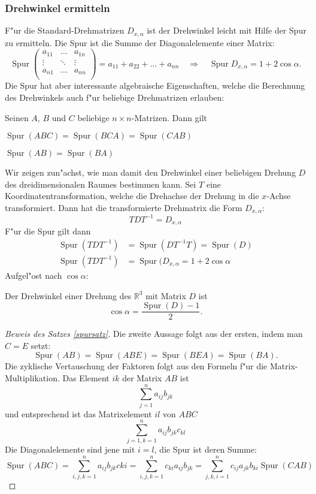 \subsubsection{Drehwinkel ermitteln}
F"ur die Standard-Drehmatrizen $D_{x,\alpha}$ ist der Drehwinkel 
leicht mit Hilfe der Spur zu ermitteln. Die Spur ist die Summe der
Diagonalelemente einer Matrix:
\[
\operatorname{Spur}
\begin{pmatrix}
a_{11}&\dots &a_{1n}\\
\vdots&\ddots&\vdots\\
a_{n1}&\dots &a_{nn}\\
\end{pmatrix}
=a_{11}+a_{22}+\dots+a_{nn}
\quad
\Rightarrow
\quad
\operatorname{Spur}D_{x,\alpha}=1+2\cos\alpha.
\]
Die Spur hat aber interessante algebraische Eigenschaften, welche
die Berechnung des Drehwinkels auch f"ur beliebige Drehmatrizen
erlauben:
\begin{satz}
\label{spursatz}
Seinen $A$, $B$ und $C$ beliebige $n\times n$-Matrizen. Dann gilt
\begin{compactenum}
\item $\operatorname{Spur}(ABC)=\operatorname{Spur}(BCA)=\operatorname{Spur}(CAB)$
\item $\operatorname{Spur}(AB)=\operatorname{Spur}(BA)$
\end{compactenum}
\end{satz}
Wir zeigen zun"achst, wie man damit den Drehwinkel einer beliebigen
Drehung $D$ des dreidimensionalen Raumes bestimmen kann. Sei $T$ eine
Koordinatentransformation, welche die Drehachse der Drehung in die
$x$-Achse transformiert. Dann hat die transformierte Drehmatrix die
Form $D_{x,\alpha}$:
\[
TDT^{-1}= D_{x,\alpha}
\]
F"ur die Spur gilt dann
\begin{align*}
\operatorname{Spur}(TDT^{-1})
&=
\operatorname{Spur}(DT^{-1}T)
=
\operatorname{Spur}(D)
\\
\operatorname{Spur}(TDT^{-1})
&=
\operatorname{Spur}(D_{x,\alpha}=1+2\cos\alpha
\end{align*}
Aufgel"ost nach $\cos\alpha$:
\begin{satz}\label{drehwinkelsatz}
Der Drehwinkel einer Drehung des $\mathbb R^3$ mit Matrix $D$ ist
\[
\cos\alpha =\frac{\operatorname{Spur}(D) -1 }2.
\]
\end{satz}

\begin{proof}[Beweis des Satzes \ref{spursatz}]
Die zweite Aussage folgt aus der ersten, indem man $C=E$ setzt:
\[
\operatorname{Spur}(AB)=\operatorname{Spur}(ABE)=\operatorname{Spur}(BEA)=
\operatorname{Spur}(BA).
\]
Die zyklische Vertauschung der Faktoren folgt aus den Formeln f"ur die
Matrix-Multiplikation. Das Element $ik$ der Matrix $AB$ ist
\[
\sum_{j=1}^na_{ij}b_{jk}
\]
und entsprechend ist das Matrixelement $il$ von $ABC$ 
\[
\sum_{j=1, k=1}^na_{ij}b_{jk}c_{kl}
\]
Die Diagonalelemente sind jene mit $i=l$, die Spur ist deren Summe:
\[
\operatorname{Spur}(ABC)
=\sum_{i,j,k=1}^na_{ij}b_{jk}c{ki}
=\sum_{i,j,k=1}^nc_{ki}a_{ij}b_{jk}
=\sum_{j,k,i=1}^nc_{ij}a_{jk}b_{ki}
\operatorname{Spur}(CAB)
\]
\end{proof}

